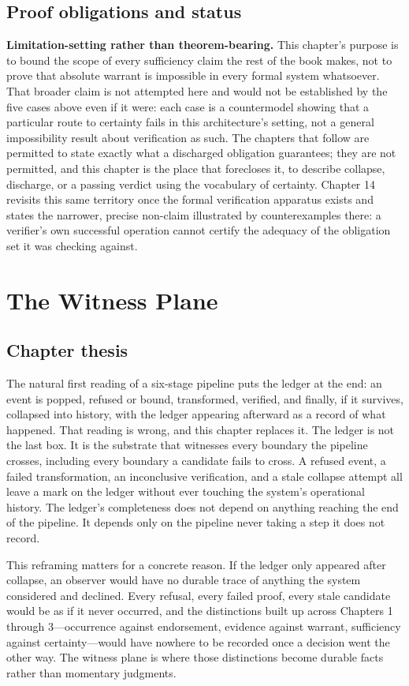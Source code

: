 \documentclass[11pt,openany]{book}
\begin{document}
\section{Proof obligations and status}
\textbf{Limitation-setting rather than theorem-bearing.} This chapter's
purpose is to bound the scope of every sufficiency claim the rest of the book
makes, not to prove that absolute warrant is impossible in every formal system
whatsoever. That broader claim is not attempted here and would not be
established by the five cases above even if it were: each case is a
countermodel showing that a particular route to certainty fails in this
architecture's setting, not a general impossibility result about verification
as such. The chapters that follow are permitted to state exactly what a
discharged obligation guarantees; they are not permitted, and this chapter is
the place that forecloses it, to describe collapse, discharge, or a passing
verdict using the vocabulary of certainty. Chapter 14 revisits this same
territory once the formal verification apparatus exists and states the
narrower, precise non-claim illustrated by counterexamples there: a verifier's
own successful operation cannot certify the adequacy of the obligation set it
was checking against.

\chapter{The Witness Plane}
\section{Chapter thesis}

The natural first reading of a six-stage pipeline puts the ledger at the end:
an event is popped, refused or bound, transformed, verified, and finally, if it
survives, collapsed into history, with the ledger appearing afterward as a
record of what happened. That reading is wrong, and this chapter replaces it.
The ledger is not the last box. It is the substrate that witnesses every
boundary the pipeline crosses, including every boundary a candidate fails to
cross. A refused event, a failed transformation, an inconclusive verification,
and a stale collapse attempt all leave a mark on the ledger without ever
touching the system's operational history. The ledger's completeness does not
depend on anything reaching the end of the pipeline. It depends only on the
pipeline never taking a step it does not record.

This reframing matters for a concrete reason. If the ledger only appeared
after collapse, an observer would have no durable trace of anything the system
considered and declined. Every refusal, every failed proof, every stale
candidate would be as if it never occurred, and the distinctions built up
across Chapters 1 through 3---occurrence against endorsement, evidence against
warrant, sufficiency against certainty---would have nowhere to be recorded
once a decision went the other way. The witness plane is where those
distinctions become durable facts rather than momentary judgments.
\end{document}
